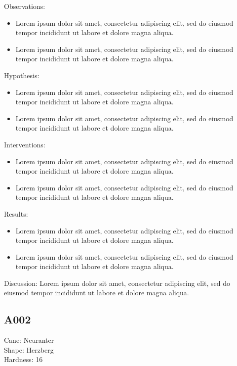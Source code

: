 \documentclass[a4paper,12pt]{memoir}
\begin{document}
Observations:
\begin{itemize}
\item Lorem ipsum dolor sit amet, consectetur adipiscing elit, sed do eiusmod tempor incididunt ut labore et dolore magna aliqua.
\item Lorem ipsum dolor sit amet, consectetur adipiscing elit, sed do eiusmod tempor incididunt ut labore et dolore magna aliqua. 
\end{itemize}
Hypothesis:
\begin{itemize}
\item Lorem ipsum dolor sit amet, consectetur adipiscing elit, sed do eiusmod tempor incididunt ut labore et dolore magna aliqua.
\item Lorem ipsum dolor sit amet, consectetur adipiscing elit, sed do eiusmod tempor incididunt ut labore et dolore magna aliqua. 
\end{itemize}
Interventions:
\begin{itemize}
\item Lorem ipsum dolor sit amet, consectetur adipiscing elit, sed do eiusmod tempor incididunt ut labore et dolore magna aliqua.
\item Lorem ipsum dolor sit amet, consectetur adipiscing elit, sed do eiusmod tempor incididunt ut labore et dolore magna aliqua. 
\end{itemize}
Results:
\begin{itemize}
\item Lorem ipsum dolor sit amet, consectetur adipiscing elit, sed do eiusmod tempor incididunt ut labore et dolore magna aliqua.
\item Lorem ipsum dolor sit amet, consectetur adipiscing elit, sed do eiusmod tempor incididunt ut labore et dolore magna aliqua. 
\end{itemize}
Discussion: Lorem ipsum dolor sit amet, consectetur adipiscing elit, sed do eiusmod tempor incididunt ut labore et dolore magna aliqua.\\

\subsection{A002}
Cane: Neuranter \\
Shape: Herzberg \\
Hardness: 16 \\
\end{document}
